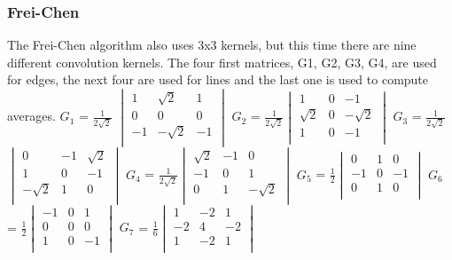 \documentclass[12pt]{article}
\begin{document}
\subsubsection{Frei-Chen}
 The Frei-Chen algorithm also uses 3x3 kernels, but this time there are nine different convolution kernels. The four first matrices, G1, G2, G3, G4, are used for edges, the next four are used for lines and the last one is used to compute averages. 
\newline
\newline
 $G_1$ = $\frac{1}{2\sqrt2}$ $\begin{vmatrix}
	1 & \sqrt2 & 1\\
	0 & 0 & 0\\
	-1 & -\sqrt2 & -1\\
\end{vmatrix}$\hspace{5mm}
$G_2$ = $\frac{1}{2\sqrt2}$$\begin{vmatrix}
	1 & 0 & -1\\
	\sqrt2 & 0 & -\sqrt2\\
	1 & 0 & -1\\
\end{vmatrix}$\hspace{5mm}
$G_3$ = $\frac{1}{2\sqrt2}$$\begin{vmatrix}
	0 & -1 & \sqrt2\\
	1 & 0 & -1\\
	-\sqrt2 & 1 & 0\\
\end{vmatrix}$\hspace{5mm}
\newline
$G_4$ = $\frac{1}{2\sqrt2}$$\begin{vmatrix}
	\sqrt2 & -1 & 0\\
	-1 & 0 & 1\\
	0 & 1 & -\sqrt2\\
\end{vmatrix}$\hspace{5mm}
$G_5$ = $\frac{1}{2}$$\begin{vmatrix}
	0 & 1 & 0\\
	-1 & 0 & -1\\
	0 & 1 & 0\\
\end{vmatrix}$\hspace{10mm}
$G_6$ = $\frac{1}{2}$$\begin{vmatrix}
	-1 & 0 & 1\\
	0 & 0 & 0\\
	1 & 0 & -1\\
\end{vmatrix}$\hspace{5mm}
\newline
$G_7$ = $\frac{1}{6}$$\begin{vmatrix}
	1 & -2 & 1\\
	-2 & 4 & -2\\
	1 & -2 & 1\\
\end{vmatrix}$\hspace{13mm}
\end{document}
